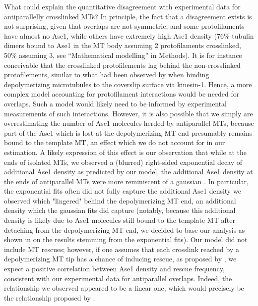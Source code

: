 What could explain the quantitative disagreement with experimental data for antiparallelly crosslinked MTs? In principle, the fact that a disagreement exists is not surprising, given that overlaps are not symmetric, and some protofilaments have almost no Ase1, while others have extremely high Ase1 density (76\% tubulin dimers bound to Ase1 in the MT body assuming 2 protofilaments crosslinked, 50\% assuming 3, see “Mathematical modelling” in Methods). It is for instance conceivable that the crosslinked protofilements lag behind the non-crosslinked protofilements, similar to what had been observed by \cite{Peet2018} when binding depolymerizing microtubules to the coverslip surface via kinesin-1. Hence, a more complex model accounting for protofilament interactions would be needed for overlaps. Such a model would likely need to be informed by experimental measurements of such interactions. However, it is also possible that we simply are overestimating the number of Ase1 molecules herded by antiparallel MTs, because part of the Ase1 which is lost at the depolymerizing MT end presumably remains bound to the template MT, an effect which we do not account for in our estimation. A likely expression of this effect is our observation that while at the ends of isolated MTs, we observed a (blurred) right-sided exponential decay of additional Ase1 density as predicted by our model, the additional Ase1 density at the ends of antiparallel MTs were more reminiscent of a gaussian . In particular, the exponential fits often did not fully capture the additional Ase1 density we observed which "lingered" behind the depolymerizing MT end, an additional density which the gaussian fits did capture (notably, because this additional density is likely due to Ase1 molecules still bound to the template MT after detaching from the depolymerizing MT end, we decided to base our analysis as shown in  on the results stemming from the exponential fits).
Our model did not include MT rescues; however, if one assumes that each crosslink reached by a depolymerizing MT tip has a chance of inducing rescue, as proposed by \cite{Stoppin-Mellet2013}, we expect a positive correlation between Ase1 density and rescue frequency, consistent with our experimental data for antiparallel overlaps. Indeed, the relationship we observed appeared to be a linear one, which would precisely be the relationship proposed by \cite{Stoppin-Mellet2013}.\par 

